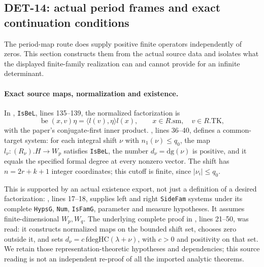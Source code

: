 \documentclass[11pt,a4paper]{article}
\begin{document}
\subsection{DET-14: actual period frames and exact continuation conditions}
The period-map route does supply positive finite operators independently
of zeros. This section constructs them from the actual source data
and isolates what the displayed finite-family realization can and
cannot provide for an infinite determinant.

\paragraph{Exact source maps, normalization and existence.}
In ,
\texttt{IsBeL}, lines 135--139, the normalized factorization is
\[
 \operatorname{be}(x,v)\eta=\langle l(v),\eta\rangle l(x),
 \qquad x\in R.\mathrm{sm},\quad v\in R.\mathrm{TK},
\]
with the paper's conjugate-first inner product.
,
lines 36--40, defines a common-target system:
for each integral shift \(\nu\) with \(n_1(\nu)\le q_0\),
the map \(l_\nu:(R_\nu).H\to W_p\) satisfies \texttt{IsBeL},
the number \(d_\nu=\mathrm{dg}(\nu)\) is positive, and it equals
the specified formal degree at every nonzero vector.
The shift has \(n=2r+k+1\) integer coordinates; this cutoff is finite,
since \(|\nu_i|\le q_0\).

This is supported by an actual existence export, not just a
definition of a desired factorization:
,
lines 17--18, supplies left and right \texttt{SideFam} systems under
its complete \texttt{HypsG}, \texttt{Num}, \texttt{IsFamG},
parameter and measure hypotheses. It assumes finite-dimensional
\(W_p,W_q\). The underlying complete proof in
,
lines 21--50, was read: it constructs normalized maps on the
bounded shift set, chooses zero outside it, and sets
\(d_\nu=c\,\mathrm{fdegHC}(\lambda+\nu)\), with \(c>0\) and
positivity on that set. We retain those representation-theoretic
hypotheses and dependencies; this source reading is not an independent
re-proof of all the imported analytic theorems.
\end{document}
